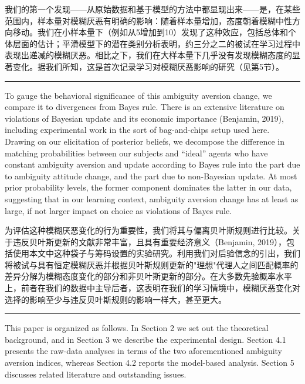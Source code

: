 \documentclass[12pt,a4paper]{article}
\newenvironment{original}
  {\par\vspace{0.5em}\noindent\color{black}\ignorespaces}
  {\par\vspace{0.3em}}
\newenvironment{translation}
  {\par\noindent\color{transblue}\ignorespaces}
  {\par\vspace{0.8em}\hrule\vspace{0.5em}}
\begin{document}
\begin{translation}
我们的第一个发现——从原始数据和基于模型的方法中都显现出来——是，在某些范围内，样本量对模糊厌恶有明确的影响：随着样本量增加，态度朝着模糊中性方向移动。我们在小样本量下（例如从5增加到10）发现了这种效应，包括总体和个体层面的估计；平滑模型下的潜在类别分析表明，约三分之二的被试在学习过程中表现出递减的模糊厌恶。相比之下，我们在大样本量下几乎没有发现模糊态度的显著变化。据我们所知，这是首次记录学习对模糊厌恶影响的研究（见第5节）。
\end{translation}

\begin{original}
To gauge the behavioral significance of this ambiguity aversion change, we compare it to divergences from Bayes rule. There is an extensive literature on violations of Bayesian update and its economic importance (Benjamin, 2019), including experimental work in the sort of bag-and-chips setup used here. Drawing on our elicitation of posterior beliefs, we decompose the difference in matching probabilities between our subjects and ``ideal'' agents who have constant ambiguity aversion and update according to Bayes rule into the part due to ambiguity attitude change, and the part due to non-Bayesian update. At most prior probability levels, the former component dominates the latter in our data, suggesting that in our learning context, ambiguity aversion change has at least as large, if not larger impact on choice as violations of Bayes rule.
\end{original}

\begin{translation}
为评估这种模糊厌恶变化的行为重要性，我们将其与偏离贝叶斯规则进行比较。关于违反贝叶斯更新的文献非常丰富，且具有重要经济意义（Benjamin, 2019），包括使用本文中这种袋子与筹码设置的实验研究。利用我们对后验信念的引出，我们将被试与具有恒定模糊厌恶并根据贝叶斯规则更新的"理想"代理人之间匹配概率的差异分解为模糊态度变化的部分和非贝叶斯更新的部分。在大多数先验概率水平上，前者在我们的数据中主导后者，这表明在我们的学习情境中，模糊厌恶变化对选择的影响至少与违反贝叶斯规则的影响一样大，甚至更大。
\end{translation}

\begin{original}
This paper is organized as follows. In Section 2 we set out the theoretical background, and in Section 3 we describe the experimental design. Section 4.1 presents the raw-data analyses in terms of the two aforementioned ambiguity aversion indices, whereas Section 4.2 reports the model-based analysis. Section 5 discusses related literature and outstanding issues.
\end{original}
\end{document}
